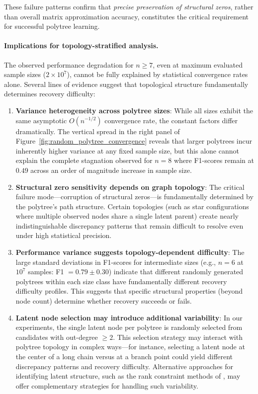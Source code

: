 \documentclass[11pt,a4paper]{article}
\numberwithin{equation}{section}
\begin{document}
These failure patterns confirm that \emph{precise preservation of structural zeros}, rather than overall matrix approximation accuracy, constitutes the critical requirement for successful polytree learning.

\paragraph{Implications for topology-stratified analysis.}

The observed performance degradation for $n \geq 7$, even at maximum evaluated sample sizes ($2 \times 10^7$), cannot be fully explained by statistical convergence rates alone. Several lines of evidence suggest that topological structure fundamentally determines recovery difficulty:

\begin{enumerate}[label=(\arabic*)]
\item \textbf{Variance heterogeneity across polytree sizes}: While all sizes exhibit the same asymptotic $O(n^{-1/2})$ convergence rate, the constant factors differ dramatically. The vertical spread in the right panel of Figure~\ref{fig:random_polytree_convergence} reveals that larger polytrees incur inherently higher variance at any fixed sample size, but this alone cannot explain the complete stagnation observed for $n=8$ where F1-scores remain at $0.49$ across an order of magnitude increase in sample size.

\item \textbf{Structural zero sensitivity depends on graph topology}: The critical failure mode---corruption of structural zeros---is fundamentally determined by the polytree's path structure. Certain topologies (such as star configurations where multiple observed nodes share a single latent parent) create nearly indistinguishable discrepancy patterns that remain difficult to resolve even under high statistical precision.

\item \textbf{Performance variance suggests topology-dependent difficulty}: The large standard deviations in F1-scores for intermediate sizes (e.g., $n=6$ at $10^7$ samples: F1 $= 0.79 \pm 0.30$) indicate that different randomly generated polytrees within each size class have fundamentally different recovery difficulty profiles. This suggests that specific structural properties (beyond node count) determine whether recovery succeeds or fails.

\item \textbf{Latent node selection may introduce additional variability}: In our experiments, the single latent node per polytree is randomly selected from candidates with out-degree $\geq 2$. This selection strategy may interact with polytree topology in complex ways---for instance, selecting a latent node at the center of a long chain versus at a branch point could yield different discrepancy patterns and recovery difficulty. Alternative approaches for identifying latent structure, such as the rank constraint methods of \citet{cai:etal:2024:rank}, may offer complementary strategies for handling such variability.
\end{enumerate}
\end{document}
